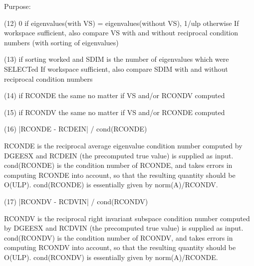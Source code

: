 \begin{DoxyParagraph}{Purpose\+: }
\begin{DoxyVerb}
    (12)    0     if eigenvalues(with VS) = eigenvalues(without VS),
            1/ulp otherwise
            If workspace sufficient, also compare VS with and without
            reciprocal condition numbers
            (with sorting of eigenvalues)

    (13)    if sorting worked and SDIM is the number of
            eigenvalues which were SELECTed
            If workspace sufficient, also compare SDIM with and
            without reciprocal condition numbers

    (14)    if RCONDE the same no matter if VS and/or RCONDV computed

    (15)    if RCONDV the same no matter if VS and/or RCONDE computed

    (16)  |RCONDE - RCDEIN| / cond(RCONDE)

       RCONDE is the reciprocal average eigenvalue condition number
       computed by DGEESX and RCDEIN (the precomputed true value)
       is supplied as input.  cond(RCONDE) is the condition number
       of RCONDE, and takes errors in computing RCONDE into account,
       so that the resulting quantity should be O(ULP). cond(RCONDE)
       is essentially given by norm(A)/RCONDV.

    (17)  |RCONDV - RCDVIN| / cond(RCONDV)

       RCONDV is the reciprocal right invariant subspace condition
       number computed by DGEESX and RCDVIN (the precomputed true
       value) is supplied as input. cond(RCONDV) is the condition
       number of RCONDV, and takes errors in computing RCONDV into
       account, so that the resulting quantity should be O(ULP).
       cond(RCONDV) is essentially given by norm(A)/RCONDE.\end{DoxyVerb}
 
\end{DoxyParagraph}

